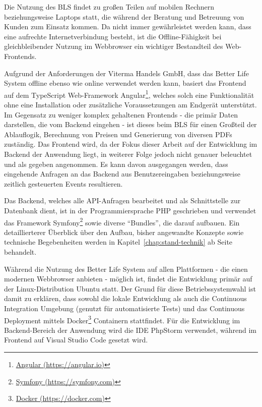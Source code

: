 \documentclass[a4paper,12pt,twoside]{scrreprt}
\begin{document}
Die Nutzung des BLS findet zu großen Teilen auf mobilen Rechnern beziehungsweise Laptops statt, die während der Beratung und Betreuung von Kunden zum Einsatz kommen. Da nicht immer gewährleistet werden kann, dass eine aufrechte Internetverbindung besteht, ist die Offline-Fähigkeit bei gleichbleibender Nutzung im Webbrowser ein wichtiger Bestandteil des Web-Frontends.

Aufgrund der Anforderungen der Viterma Handels GmbH, dass das Better Life System offline ebenso wie online verwendet werden kann, basiert das Frontend auf dem TypeScript Web-Framework Angular\footnote{\href{https://angular.io/}{Angular (https://angular.io)}}, welches solch eine Funktionalität ohne eine Installation oder zusätzliche Voraussetzungen am Endgerät unterstützt. Im Gegensatz zu weniger komplex gehaltenen Frontends - die primär Daten darstellen, die vom Backend eingehen - ist dieses beim BLS für einen Großteil der Ablauflogik, Berechnung von Preisen und Generierung von diversen PDFs zuständig. Das Frontend wird, da der Fokus dieser Arbeit auf der Entwicklung im Backend der Anwendung liegt, in weiterer Folge jedoch nicht genauer beleuchtet und als gegeben angenommen. Es kann davon ausgegangen werden, dass eingehende Anfragen an das Backend aus Benutzereingaben beziehungsweise zeitlich gesteuerten Events resultieren.

\pagebreak

Das Backend, welches alle API-Anfragen bearbeitet und als Schnittstelle zur Datenbank dient, ist in der Programmiersprache PHP geschrieben und verwendet das Framework Symfony\footnote{\href{https://symfony.com/}{Symfony (https://symfony.com)}} sowie diverse \enquote{Bundles}, die darauf aufbauen. Ein detaillierterer Überblick über den Aufbau, bisher angewandte Konzepte sowie technische Begebenheiten werden in Kapitel~\ref{chap:stand-technik} ab Seite \pageref{chap:stand-technik} behandelt.

\medskip

Während die Nutzung des Better Life System auf allen Plattformen - die einen modernen Webbrowser anbieten - möglich ist, findet die Entwicklung primär auf der Linux-Distribution Ubuntu statt. Der Grund für diese Betriebssystemwahl ist damit zu erklären, dass sowohl die lokale Entwicklung als auch die Continuous Integration Umgebung (genutzt für automatisierte Tests) und das Continuous Deployment mittels Docker\footnote{\href{https://docker.com}{Docker (https://docker.com)}} Containern stattfindet. Für die Entwicklung im Backend-Bereich der Anwendung wird die IDE PhpStorm verwendet, während im Frontend auf Visual Studio Code gesetzt wird.
\end{document}
